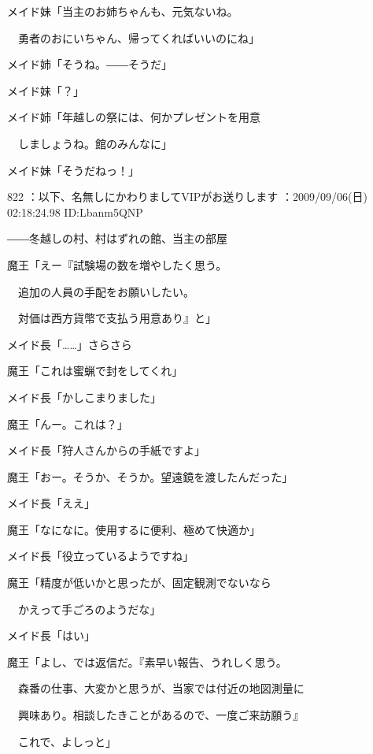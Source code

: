 \documentclass[a4j,twocolumn]{tarticle}
\begin{document}
メイド妹「当主のお姉ちゃんも、元気ないね。\par{} 
　勇者のおにいちゃん、帰ってくればいいのにね」\par{} 
メイド姉「そうね。――そうだ」\par{} 
メイド妹「？」 



メイド姉「年越しの祭には、何かプレゼントを用意\par{} 
　しましょうね。館のみんなに」\par{} 
メイド妹「そうだねっ！」 

	
    
    

822 ：以下、名無しにかわりましてVIPがお送りします ：2009/09/06(日) 02:18:24.98 ID:Lbanm5QNP 


――冬越しの村、村はずれの館、当主の部屋 



魔王「えー『試験場の数を増やしたく思う。\par{} 
　追加の人員の手配をお願いしたい。\par{} 
　対価は西方貨幣で支払う用意あり』と」 



メイド長「……」さらさら 



魔王「これは蜜蝋で封をしてくれ」\par{} 
メイド長「かしこまりました」 



魔王「んー。これは？」 



メイド長「狩人さんからの手紙ですよ」 



魔王「おー。そうか、そうか。望遠鏡を渡したんだった」\par{} 
メイド長「ええ」 



魔王「なになに。使用するに便利、極めて快適か」\par{} 
メイド長「役立っているようですね」 



魔王「精度が低いかと思ったが、固定観測でないなら\par{} 
　かえって手ごろのようだな」\par{} 
メイド長「はい」 



魔王「よし、では返信だ。『素早い報告、うれしく思う。\par{} 
　森番の仕事、大変かと思うが、当家では付近の地図測量に\par{} 
　興味あり。相談したきことがあるので、一度ご来訪願う』\par{} 
　これで、よしっと」 
\end{document}
